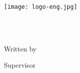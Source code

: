 
\begin{center}
\begin{latin}
\texttt{[image: logo-eng.jpg]} \\ [-0.2em]
\EnglishThesisUniversity \\ [-0.3em]
\EnglishThesisDepartment

\vspace{0.75cm}
{\large\EnglishThesisDegree} \\ [-0.2em]
{\large\EnglishThesisMajor}

\vspace{2cm}
{\Large\textbf\EnglishThesisTitle}

\vspace{2.5cm}
Written by \\
{\large\textbf{\EnglishThesisAuthor}}

\vspace{1cm}
Supervisor \\ 
{\large\textbf{\EnglishThesisSupervisor}}

\vspace{1.5cm}
\EnglishThesisDate
\end{latin}
\end{center}
